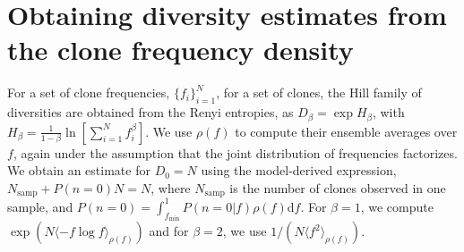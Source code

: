 \documentclass[letterpaper,english,prl,reprint,longbibliography]{revtex4-1} %
\begin{document}
% 


\section{Obtaining diversity estimates from the clone frequency density}\label{sec:infer_div}
For a set of clone frequencies, $\{f_i\}_{i=1}^{N}$, for a set of clones, the Hill family of diversities are obtained from the Renyi entropies, as $D_\beta=\exp H_\beta$, with $H_\beta=\frac{1}{1-\beta}\ln \left[ \sum_{i=1}^N f_i^{\beta}\right]$. We use $\rho(f)$ to compute their ensemble averages over $f$, again under the assumption that the joint distribution of frequencies factorizes. We obtain an estimate for $D_0=N$ using the model-derived expression, $N_{\textrm{samp}}+P(n=0)N=N$, where $N_{\textrm{samp}}$ is the number of clones observed in one sample, and $P(n=0)=\int_{f_{\textrm{min}}}^1 P(n=0|f)\rho(f)\textrm{d}f$. For $\beta=1$, we compute $\exp (N\langle -f\log f \rangle_{\rho(f)})$ and for $\beta=2$, we use $1/\left(N\langle f^2\rangle_{\rho(f)}\right)$.
\end{document}
